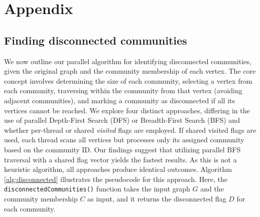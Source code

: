 \section{Appendix}

\subsection{Finding disconnected communities}

We now outline our parallel algorithm for identifying disconnected communities, given the original graph and the community membership of each vertex. The core concept involves determining the size of each community, selecting a vertex from each community, traversing within the community from that vertex (avoiding adjacent communities), and marking a community as disconnected if all its vertices cannot be reached. We explore four distinct approaches, differing in the use of parallel Depth-First Search (DFS) or Breadth-First Search (BFS) and whether per-thread or shared \textit{visited} flags are employed. If shared visited flags are used, each thread scans all vertices but processes only its assigned community based on the community ID. Our findings suggest that utilizing parallel BFS traversal with a shared flag vector yields the fastest results. As this is not a heuristic algorithm, all approaches produce identical outcomes. Algorithm \ref{alg:disconnected} illustrates the pseudocode for this approach. Here, the \texttt{disconnectedCommunities()} function takes the input graph $G$ and the community membership $C$ as input, and it returns the disconnected flag $D$ for each community.

